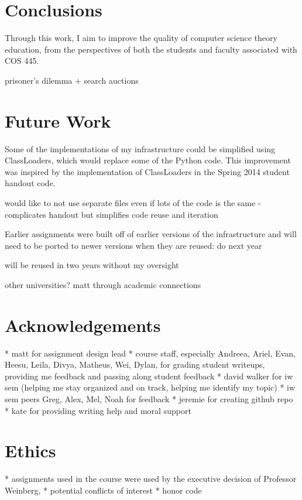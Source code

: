 \documentclass[pageno]{jpaper}
\begin{document}

\section*{Conclusions}
Through this work, I aim to improve the quality of computer science theory education, from the perspectives of both the students and faculty associated with COS 445.

prisoner's dilemma + search auctions



\section*{Future Work}

Some of the implementations of my infrastructure could be simplified using ClassLoaders, which would replace some of the Python code.
This improvement was inspired by the implementation of ClassLoaders in the Spring 2014 student handout code.

would like to not use separate files even if lots of the code is the same - complicates handout but simplifies code reuse and iteration

Earlier assignments were built off of earlier versions of the infrastructure and will need to be ported to newer versions when they are reused: do next year

will be reused in two years without my oversight

other universities? matt through academic connections

\section*{Acknowledgements}
* matt for assignment design lead
* course staff, especially Andreea, Ariel, Evan, Heesu, Leila, Divya, Matheus, Wei, Dylan, for grading student writeups, providing me feedback and passing along student feedback
* david walker for iw sem (helping me stay organized and on track, helping me identify my topic)
* iw sem peers Greg, Alex, Mel, Noah for feedback
* jeremie for creating github repo
* kate for providing writing help and moral support

\section*{Ethics}
* assignments used in the course were used by the executive decision of Professor Weinberg,
* potential conflicts of interest
* honor code
\end{document}
